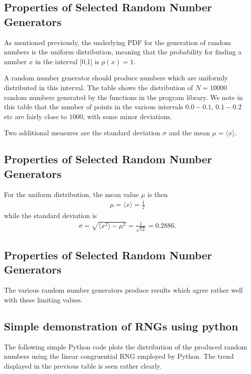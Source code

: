\documentclass[letterpaper,10pt,english]{sphinxmanual}
\begin{document}
\subsection{Properties of Selected Random Number Generators}
\label{\detokenize{chapter2:properties-of-selected-random-number-generators}}
As mentioned previously, the underlying PDF for the generation of
random numbers is the uniform distribution, meaning that the
probability for finding a number \(x\) in the interval {[}0,1{]} is \(p(x)=1\).

A random number generator should produce numbers which are uniformly distributed
in this interval. The table  shows the distribution of \(N=10000\) random
numbers generated by the functions in the program library.
We note in this table that the number of points in the various
intervals \(0.0-0.1\), \(0.1-0.2\) etc are fairly close to \(1000\), with some minor
deviations.

Two additional measures are the standard deviation \(\sigma\) and the mean
\(\mu=\langle x\rangle\).


\subsection{Properties of Selected Random Number Generators}
\label{\detokenize{chapter2:id13}}
For the uniform distribution, the mean value \(\mu\) is then
\begin{equation*}
\begin{split}
\mu=\langle x\rangle=\frac{1}{2}
\end{split}
\end{equation*}
while the standard deviation is
\begin{equation*}
\begin{split}
\sigma=\sqrt{\langle x^2\rangle-\mu^2}=\frac{1}{\sqrt{12}}=0.2886.
\end{split}
\end{equation*}

\subsection{Properties of Selected Random Number Generators}
\label{\detokenize{chapter2:id14}}
The various random number generators produce results which agree rather well with
these limiting values.




\subsection{Simple demonstration of RNGs using python}
\label{\detokenize{chapter2:simple-demonstration-of-rngs-using-python}}
The following simple Python code plots the distribution of the produced random numbers using the linear congruential RNG employed by Python. The trend displayed in the previous table is seen rather clearly.
\end{document}
